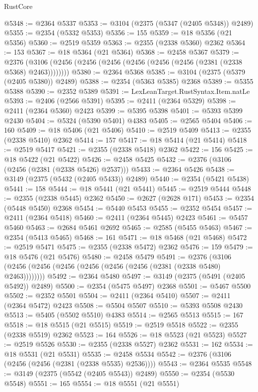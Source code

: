 \begin{lexlean}{RustCore}
\begin{coremodule}
@5348 := @2364 @5337
@5353 := @3104 (@2375 (@5347 (@2405 @5348)) @2489)
@5355 := @2354 (@5332 @5353)
@5356 := 155
@5359 := @18 @5356 (@21 @5356)
@5360 := @2519 @5359
@5363 := @2355 (@2338 @5360) @2362
@5364 := 153
@5367 := @18 @5364 (@21 @5364)
@5368 := @2458 @5367
@5379 := @2376 (@3106 (@2456 (@2456 (@2456 (@2456 (@2456 (@2456 (@2381 (@2338 @5368) @2463))))))))
@5380 := @2364 @5368
@5385 := @3104 (@2375 (@5379 (@2405 @5380)) @2489)
@5388 := @2354 (@5363 @5385) @2368
@5389 := @5355 @5388
@5390 := @2352 @5389
@5391 := LexLeanTarget.RustSyntax.Item.natLe
@5393 := @2406 (@2566 @5391)
@5395 := @2411 (@2364 @5329)
@5398 := @2411 (@2364 @5360) @2423
@5399 := @5395 @5398
@5401 := @5393 @5399 @2430
@5404 := @5324 (@5390 @5401) @4383
@5405 := @2565 @5404
@5406 := 160
@5409 := @18 @5406 (@21 @5406)
@5410 := @2519 @5409
@5413 := @2355 (@2338 @5410) @2362
@5414 := 157
@5417 := @18 @5414 (@21 @5414)
@5418 := @2519 @5417
@5421 := @2355 (@2338 @5418) @2362
@5422 := 156
@5425 := @18 @5422 (@21 @5422)
@5426 := @2458 @5425
@5432 := @2376 (@3106 (@2456 (@2381 (@2338 @5426) @2537)))
@5433 := @2364 @5426
@5438 := @3149 (@2375 (@5432 (@2405 @5433)) @2489)
@5440 := @2354 (@5421 @5438)
@5441 := 158
@5444 := @18 @5441 (@21 @5441)
@5445 := @2519 @5444
@5448 := @2355 (@2338 @5445) @2362
@5450 := @2627 (@2628 @171)
@5453 := @2354 (@5448 @5450) @2368
@5454 := @5440 @5453
@5455 := @2352 @5454
@5457 := @2411 (@2364 @5418)
@5460 := @2411 (@2364 @5445) @2423
@5461 := @5457 @5460
@5463 := @2684 @5461 @2692
@5465 := @2585 (@5455 @5463)
@5467 := @2354 (@5413 @5465)
@5468 := 161
@5471 := @18 @5468 (@21 @5468)
@5472 := @2519 @5471
@5475 := @2355 (@2338 @5472) @2362
@5476 := 159
@5479 := @18 @5476 (@21 @5476)
@5480 := @2458 @5479
@5491 := @2376 (@3106 (@2456 (@2456 (@2456 (@2456 (@2456 (@2456 (@2381 (@2338 @5480) @2463))))))))
@5492 := @2364 @5480
@5497 := @3149 (@2375 (@5491 (@2405 @5492)) @2489)
@5500 := @2354 (@5475 @5497) @2368
@5501 := @5467 @5500
@5502 := @2352 @5501
@5504 := @2411 (@2364 @5410)
@5507 := @2411 (@2364 @5472) @2423
@5508 := @5504 @5507
@5510 := @5393 @5508 @2430
@5513 := @5405 (@5502 @5510) @4383
@5514 := @2565 @5513
@5515 := 167
@5518 := @18 @5515 (@21 @5515)
@5519 := @2519 @5518
@5522 := @2355 (@2338 @5519) @2362
@5523 := 164
@5526 := @18 @5523 (@21 @5523)
@5527 := @2519 @5526
@5530 := @2355 (@2338 @5527) @2362
@5531 := 162
@5534 := @18 @5531 (@21 @5531)
@5535 := @2458 @5534
@5542 := @2376 (@3106 (@2456 (@2456 (@2381 (@2338 @5535) @2536))))
@5543 := @2364 @5535
@5548 := @3149 (@2375 (@5542 (@2405 @5543)) @2489)
@5550 := @2354 (@5530 @5548)
@5551 := 165
@5554 := @18 @5551 (@21 @5551)

\end{coremodule}
\end{lexlean}
